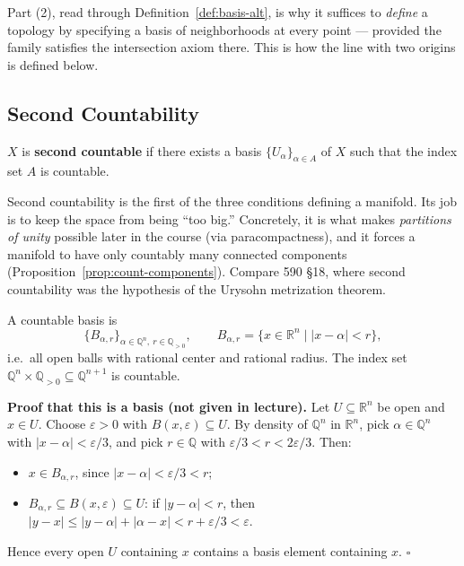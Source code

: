 \documentclass[11pt]{report}
\makeatletter
\newcounter{defcounter}[section]
\newcounter{excounter}[section]
\renewenvironment{proof}[1][Proof]{\noindent\textbf{#1.} }{\hfill$\square$\par\vspace{5pt}}
\newcommand{\deflabel}[1]{\edef\@currentlabel{\arabic{section}.\arabic{defcounter}}\label{#1}}
\newcommand{\exlabel}[1]{\edef\@currentlabel{\arabic{section}.\arabic{excounter}}\label{#1}}
\newcommand{\leeref}[1]{\par\smallskip{\raggedleft\footnotesize\textsc{Lee}:\ #1\par}}
\makeatother
\begin{document}
\begin{rembox}\label{rem:review}
Part (2), read through Definition~\ref{def:basis-alt}, is why it suffices to \emph{define} a topology by specifying a basis of neighborhoods at every point --- provided the family satisfies the intersection axiom there. This is how the line with two origins is defined below.
\end{rembox}

\subsection{Second Countability}

\begin{defbox}\deflabel{def:second-countable}
$X$ is \textbf{second countable} if there exists a basis $\{U_\alpha\}_{\alpha \in A}$ of $X$ such that the index set $A$ is countable.
\end{defbox}

\begin{rembox}\label{rem:why-second-countability}
Second countability is the first of the three conditions defining a manifold. Its job is to keep the space from being ``too big.'' Concretely, it is what makes \emph{partitions of unity} possible later in the course (via paracompactness), and it forces a manifold to have only countably many connected components (Proposition~\ref{prop:count-components}). Compare 590 \S18, where second countability was the hypothesis of the Urysohn metrization theorem.
\end{rembox}

\begin{exbox}\exlabel{ex:rn-2c}
A countable basis is
\[
\{B_{\alpha, r}\}_{\alpha \in \mathbb{Q}^n,\ r \in \mathbb{Q}_{>0}}, \qquad B_{\alpha, r} = \{x \in \mathbb{R}^n \mid |x - \alpha| < r\},
\]
i.e.\ all open balls with rational center and rational radius. The index set $\mathbb{Q}^n \times \mathbb{Q}_{>0} \subseteq \mathbb{Q}^{n+1}$ is countable.
\leeref{App.~A, \emph{Topological Spaces}}
\end{exbox}

\begin{proof}[Proof that this is a basis (not given in lecture)]
Let $U \subseteq \mathbb{R}^n$ be open and $x \in U$. Choose $\varepsilon > 0$ with $B(x, \varepsilon) \subseteq U$. By density of $\mathbb{Q}^n$ in $\mathbb{R}^n$, pick $\alpha \in \mathbb{Q}^n$ with $|x - \alpha| < \varepsilon/3$, and pick $r \in \mathbb{Q}$ with $\varepsilon/3 < r < 2\varepsilon/3$. Then:
\begin{itemize}
    \item $x \in B_{\alpha, r}$, since $|x - \alpha| < \varepsilon/3 < r$;
    \item $B_{\alpha, r} \subseteq B(x, \varepsilon) \subseteq U$: if $|y - \alpha| < r$, then $|y - x| \le |y - \alpha| + |\alpha - x| < r + \varepsilon/3 < \varepsilon$.
\end{itemize}
Hence every open $U$ containing $x$ contains a basis element containing $x$.
\end{proof}
\end{document}
